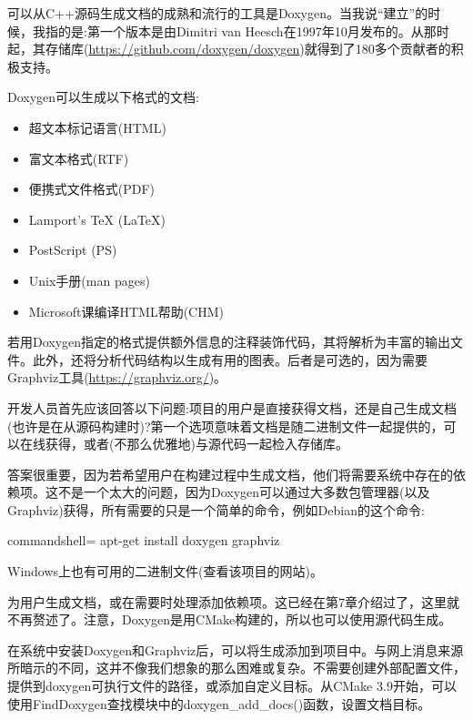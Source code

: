 可以从C++源码生成文档的成熟和流行的工具是Doxygen。当我说“建立”的时候，我指的是:第一个版本是由Dimitri van Heesch在1997年10月发布的。从那时起，其存储库(\url{https://github.com/doxygen/doxygen})就得到了180多个贡献者的积极支持。

Doxygen可以生成以下格式的文档:

\begin{itemize}
\item 
超文本标记语言(HTML)

\item 
富文本格式(RTF)

\item 
便携式文件格式(PDF)

\item 
Lamport's TeX (LaTeX)

\item 
PostScript (PS)

\item 
Unix手册(man pages)

\item 
Microsoft课编译HTML帮助(CHM)
\end{itemize}

若用Doxygen指定的格式提供额外信息的注释装饰代码，其将解析为丰富的输出文件。此外，还将分析代码结构以生成有用的图表。后者是可选的，因为需要Graphviz工具(\url{https://graphviz.org/})。

开发人员首先应该回答以下问题:项目的用户是直接获得文档，还是自己生成文档(也许是在从源码构建时)?第一个选项意味着文档是随二进制文件一起提供的，可以在线获得，或者(不那么优雅地)与源代码一起检入存储库。

答案很重要，因为若希望用户在构建过程中生成文档，他们将需要系统中存在的依赖项。这不是一个太大的问题，因为Doxygen可以通过大多数包管理器(以及Graphviz)获得，所有需要的只是一个简单的命令，例如Debian的这个命令:

\begin{tcblisting}{commandshell={}}
apt-get install doxygen graphviz
\end{tcblisting}

Windows上也有可用的二进制文件(查看该项目的网站)。

为用户生成文档，或在需要时处理添加依赖项。这已经在第7章介绍过了，这里就不再赘述了。注意，Doxygen是用CMake构建的，所以也可以使用源代码生成。

在系统中安装Doxygen和Graphviz后，可以将生成添加到项目中。与网上消息来源所暗示的不同，这并不像我们想象的那么困难或复杂。不需要创建外部配置文件，提供到doxygen可执行文件的路径，或添加自定义目标。从CMake 3.9开始，可以使用FindDoxygen查找模块中的doxygen\_add\_docs()函数，设置文档目标。

